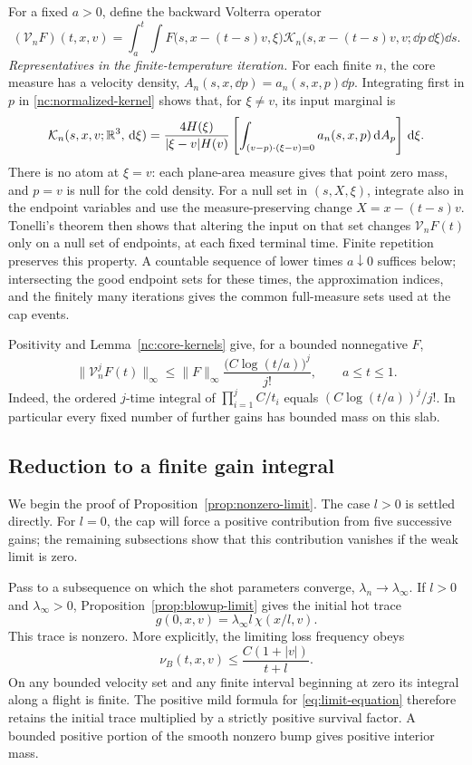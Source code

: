 For a fixed \(a>0\), define the backward Volterra operator
\begin{equation}
\label{nc:volterra}
 (\mathcal V_n F)(t,x,v)
 =
 \int_a^t\int
 F\bigl(s,x-(t-s)v,\xi\bigr)
 \mathcal K_n\bigl(s,x-(t-s)v,v;\dd p\,\dd\xi\bigr)\dd s .
\end{equation}
\emph{Representatives in the finite-temperature iteration.}
For each finite \(n\), the core measure has a velocity density,
\(A_n(s,x,\dd p)=a_n(s,x,p)\dd p\).
Integrating first in \(p\) in \eqref{nc:normalized-kernel} shows that,
for \(\xi\ne v\), its input marginal is
\[
\mathcal K_n(s,x,v;\mathbb R^3,\,\mathrm d\xi)
=\frac{4H(\xi)}{|\xi-v|H(v)}
  \left[\int_{(v-p)\cdot(\xi-v)=0}
       a_n(s,x,p)\,\mathrm d A_p\right]\,\mathrm d\xi.
\]
There is no atom at \(\xi=v\): each plane-area measure gives that
point zero mass, and \(p=v\) is null for the cold density.
For a null set in \((s,X,\xi)\), integrate also in the endpoint
variables and use the measure-preserving change
\(X=x-(t-s)v\). Tonelli's theorem then shows that altering the input
on that set changes \(\mathcal V_nF(t)\) only on a null set of
endpoints, at each fixed terminal time. Finite repetition preserves
this property. A countable sequence of lower times \(a\downarrow0\)
suffices below; intersecting the good endpoint sets for these times,
the approximation indices, and the finitely many iterations gives
the common full-measure sets used at the cap events.

Positivity and Lemma~\ref{nc:core-kernels} give, for a bounded
nonnegative \(F\),
\begin{equation}
\label{nc:iteration-norm}
 \|\mathcal V_n^jF(t)\|_\infty
 \le \|F\|_\infty\frac{\bigl(C\log(t/a)\bigr)^j}{j!},
 \qquad a\le t\le1.
\end{equation}
Indeed, the ordered \(j\)-time integral of
\(\prod_{i=1}^j C/t_i\) equals
\((C\log(t/a))^j/j!\).  In particular every fixed number of further
gains has bounded mass on this slab.

\subsection{Reduction to a finite gain integral}

We begin the proof of Proposition~\ref{prop:nonzero-limit}. The case
\(l>0\) is settled directly. For \(l=0\), the cap will force a
positive contribution from five successive gains; the remaining
subsections show that this contribution vanishes if the weak limit is zero.


Pass to a subsequence on which the shot parameters converge,
\(\lambda_n\to\lambda_\infty\).  If \(l>0\) and
\(\lambda_\infty>0\), Proposition~\ref{prop:blowup-limit}
gives the initial hot trace
\[
 g(0,x,v)=\lambda_\infty l\,\chi(x/l,v).
\]
This trace is nonzero.  More explicitly, the limiting loss
frequency obeys
\[
 \nu_B(t,x,v)\le
       \frac{C(1+|v|)}{t+l}.
\]
On any bounded velocity set and any finite interval beginning
at zero its integral along a flight is finite.  The positive
mild formula for \eqref{eq:limit-equation} therefore retains
the initial trace multiplied by a strictly positive survival
factor.  A bounded positive portion of the smooth nonzero bump
gives positive interior mass.

